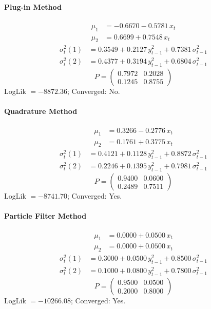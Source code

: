 \documentclass[11pt, a4paper]{article}
\begin{document}
\paragraph{Plug-in Method}
\begin{align}
\mu_{1} &= -0.6670 -0.5781\, x_t \\
\mu_{2} &= 0.6699 + 0.7548\, x_t
\end{align}
\begin{align}
\sigma^2_{t}(1) &= 0.3549 + 0.2127\, y_{t-1}^2 + 0.7381\, \sigma^2_{t-1} \\
\sigma^2_{t}(2) &= 0.4377 + 0.3194\, y_{t-1}^2 + 0.6804\, \sigma^2_{t-1}
\end{align}
\begin{equation}
P = \begin{pmatrix} 0.7972 & 0.2028 \\ 0.1245 & 0.8755 \end{pmatrix}
\end{equation}
LogLik $= -8872.36$; Converged: No.

\paragraph{Quadrature Method}
\begin{align}
\mu_{1} &= 0.3266 -0.2776\, x_t \\
\mu_{2} &= 0.1761 + 0.3775\, x_t
\end{align}
\begin{align}
\sigma^2_{t}(1) &= 0.4121 + 0.1128\, y_{t-1}^2 + 0.8872\, \sigma^2_{t-1} \\
\sigma^2_{t}(2) &= 0.2246 + 0.1395\, y_{t-1}^2 + 0.7981\, \sigma^2_{t-1}
\end{align}
\begin{equation}
P = \begin{pmatrix} 0.9400 & 0.0600 \\ 0.2489 & 0.7511 \end{pmatrix}
\end{equation}
LogLik $= -8741.70$; Converged: Yes.

\paragraph{Particle Filter Method}
\begin{align}
\mu_{1} &= 0.0000 + 0.0500\, x_t \\
\mu_{2} &= 0.0000 + 0.0500\, x_t
\end{align}
\begin{align}
\sigma^2_{t}(1) &= 0.3000 + 0.0500\, y_{t-1}^2 + 0.8500\, \sigma^2_{t-1} \\
\sigma^2_{t}(2) &= 0.1000 + 0.0800\, y_{t-1}^2 + 0.7800\, \sigma^2_{t-1}
\end{align}
\begin{equation}
P = \begin{pmatrix} 0.9500 & 0.0500 \\ 0.2000 & 0.8000 \end{pmatrix}
\end{equation}
LogLik $= -10266.08$; Converged: Yes.
\end{document}
